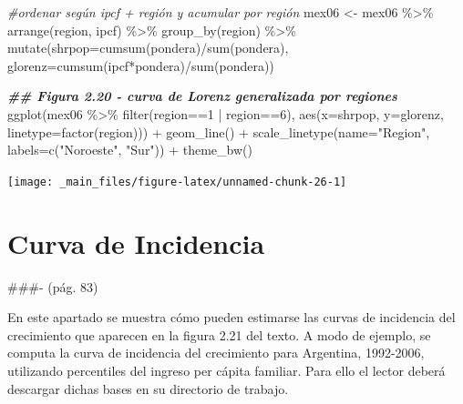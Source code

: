 \documentclass[
]{book}
\newenvironment{Shaded}{\begin{snugshade}}{\end{snugshade}}
\newcommand{\AttributeTok}[1]{\textcolor[rgb]{0.77,0.63,0.00}{#1}}
\newcommand{\CommentTok}[1]{\textcolor[rgb]{0.56,0.35,0.01}{\textit{#1}}}
\newcommand{\DecValTok}[1]{\textcolor[rgb]{0.00,0.00,0.81}{#1}}
\newcommand{\DocumentationTok}[1]{\textcolor[rgb]{0.56,0.35,0.01}{\textbf{\textit{#1}}}}
\newcommand{\FunctionTok}[1]{\textcolor[rgb]{0.00,0.00,0.00}{#1}}
\newcommand{\NormalTok}[1]{#1}
\newcommand{\OtherTok}[1]{\textcolor[rgb]{0.56,0.35,0.01}{#1}}
\newcommand{\SpecialCharTok}[1]{\textcolor[rgb]{0.00,0.00,0.00}{#1}}
\newcommand{\StringTok}[1]{\textcolor[rgb]{0.31,0.60,0.02}{#1}}
\begin{document}
\begin{Shaded}
\begin{Highlighting}[]
\CommentTok{\#ordenar según ipcf + región y acumular por región}
\NormalTok{mex06 }\OtherTok{\textless{}{-}}\NormalTok{ mex06 }\SpecialCharTok{\%\textgreater{}\%} \FunctionTok{arrange}\NormalTok{(region, ipcf) }\SpecialCharTok{\%\textgreater{}\%} 
                   \FunctionTok{group\_by}\NormalTok{(region) }\SpecialCharTok{\%\textgreater{}\%} 
                   \FunctionTok{mutate}\NormalTok{(}\AttributeTok{shrpop=}\FunctionTok{cumsum}\NormalTok{(pondera)}\SpecialCharTok{/}\FunctionTok{sum}\NormalTok{(pondera),}
                          \AttributeTok{glorenz=}\FunctionTok{cumsum}\NormalTok{(ipcf}\SpecialCharTok{*}\NormalTok{pondera)}\SpecialCharTok{/}\FunctionTok{sum}\NormalTok{(pondera)) }

\DocumentationTok{\#\# Figura 2.20 {-} curva de Lorenz generalizada por regiones}
\FunctionTok{ggplot}\NormalTok{(mex06 }\SpecialCharTok{\%\textgreater{}\%} \FunctionTok{filter}\NormalTok{(region}\SpecialCharTok{==}\DecValTok{1} \SpecialCharTok{|}\NormalTok{ region}\SpecialCharTok{==}\DecValTok{6}\NormalTok{),}
       \FunctionTok{aes}\NormalTok{(}\AttributeTok{x=}\NormalTok{shrpop, }\AttributeTok{y=}\NormalTok{glorenz, }\AttributeTok{linetype=}\FunctionTok{factor}\NormalTok{(region))) }\SpecialCharTok{+}
  \FunctionTok{geom\_line}\NormalTok{() }\SpecialCharTok{+}
  \FunctionTok{scale\_linetype}\NormalTok{(}\AttributeTok{name=}\StringTok{"Region"}\NormalTok{, }\AttributeTok{labels=}\FunctionTok{c}\NormalTok{(}\StringTok{"Noroeste"}\NormalTok{, }\StringTok{"Sur"}\NormalTok{)) }\SpecialCharTok{+}
  \FunctionTok{theme\_bw}\NormalTok{()}
\end{Highlighting}
\end{Shaded}

\texttt{[image: \_main\_files/figure-latex/unnamed-chunk-26-1]}

\hypertarget{curva-de-incidencia}{%
\section{Curva de Incidencia}\label{curva-de-incidencia}}

\#\#\#- (pág. 83)

En este apartado se muestra cómo pueden estimarse las curvas de incidencia del crecimiento que aparecen en la figura 2.21 del texto. A modo de ejemplo, se computa la curva de incidencia del crecimiento para Argentina, 1992-2006, utilizando percentiles del ingreso per cápita familiar. Para ello el lector deberá descargar dichas bases en su directorio de trabajo.
\end{document}
